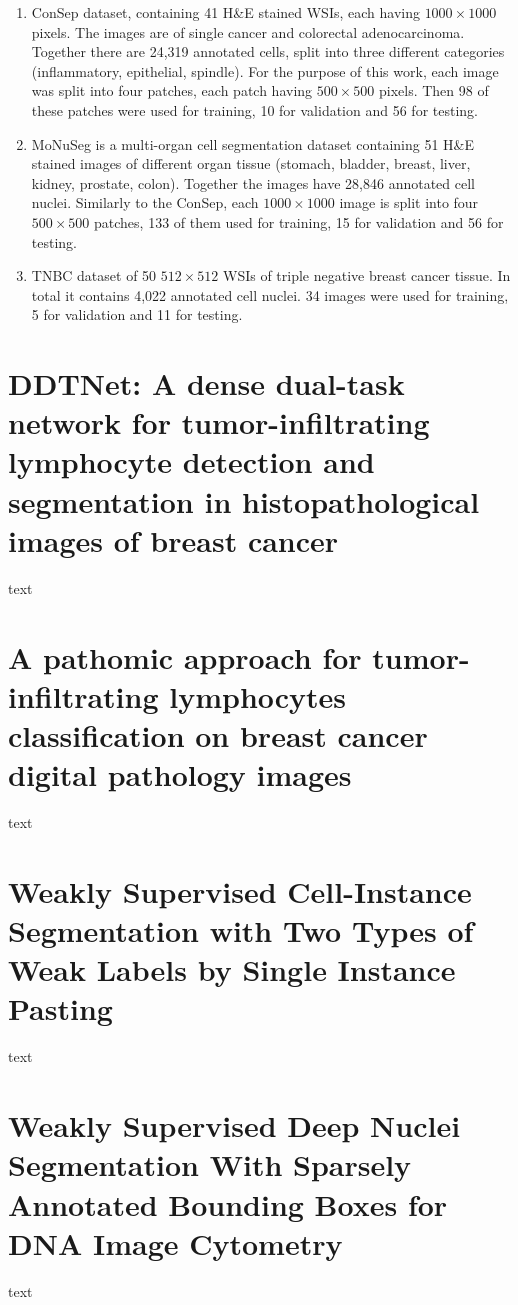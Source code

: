 \begin{enumerate}
    \item ConSep dataset, containing 41 H\&E stained WSIs, each having $1000\times1000$ pixels. The images are of single cancer and colorectal adenocarcinoma. Together there are 24,319 annotated cells, split into three different categories (inflammatory, epithelial, spindle). For the purpose of this work, each image was split into four patches, each patch having $500\times500$ pixels. Then 98 of these patches were used for training, 10 for validation and 56 for testing.
    \item MoNuSeg is a multi-organ cell segmentation dataset containing 51 H\&E stained images of different organ tissue (stomach, bladder, breast, liver, kidney, prostate, colon). Together the images have 28,846 annotated cell nuclei. Similarly to the ConSep, each $1000\times1000$ image is split into four $500\times500$ patches, 133 of them used for training, 15 for validation and 56 for testing.
    \item TNBC dataset of 50 $512\times512$ WSIs of triple negative breast cancer tissue. In total it contains 4,022 annotated cell nuclei. 34 images were used for training, 5 for validation and 11 for testing.
\end{enumerate}

\section{DDTNet: A dense dual-task network for tumor-infiltrating lymphocyte detection and segmentation in histopathological images of breast cancer \cite{Zhang2022}}
text

\section{A pathomic approach for tumor-infiltrating lymphocytes classification on breast cancer digital pathology images \cite{Verdicchio2023}}
text


\section{Weakly Supervised Cell-Instance Segmentation with Two Types of Weak Labels by Single Instance Pasting \cite{Nishimura2023}}
text

\section{Weakly Supervised Deep Nuclei Segmentation With Sparsely Annotated Bounding Boxes for DNA Image Cytometry \cite{Liang2023}}
text